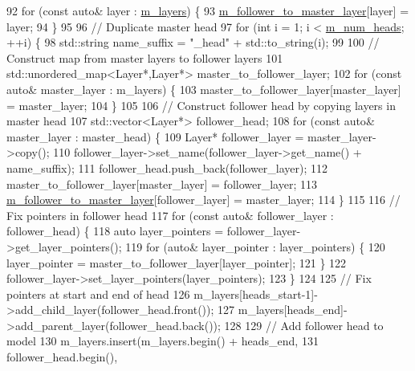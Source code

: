 \begin{DoxyCode}
92   \textcolor{keywordflow}{for} (\textcolor{keyword}{const} \textcolor{keyword}{auto}& layer : \hyperlink{classlbann_1_1model_a0229fc226ec163d1411548446104569d}{m\_layers}) \{
93     \hyperlink{classlbann_1_1siamese__model_aae7af40b4a2db59082cd4c9149a1affd}{m\_follower\_to\_master\_layer}[layer] = layer;
94   \}
95 
96   \textcolor{comment}{// Duplicate master head}
97   \textcolor{keywordflow}{for} (\textcolor{keywordtype}{int} i = 1; i < \hyperlink{classlbann_1_1siamese__model_ad0d7ba3cf40120b4f8e32675c5e9b3db}{m\_num\_heads}; ++i) \{
98     std::string name\_suffix = \textcolor{stringliteral}{"\_head"} + std::to\_string(i);
99 
100     \textcolor{comment}{// Construct map from master layers to follower layers}
101     std::unordered\_map<Layer*,Layer*> master\_to\_follower\_layer;
102     \textcolor{keywordflow}{for} (\textcolor{keyword}{const} \textcolor{keyword}{auto}& master\_layer : m\_layers) \{
103       master\_to\_follower\_layer[master\_layer] = master\_layer;
104     \}
105 
106     \textcolor{comment}{// Construct follower head by copying layers in master head}
107     std::vector<Layer*> follower\_head;
108     \textcolor{keywordflow}{for} (\textcolor{keyword}{const} \textcolor{keyword}{auto}& master\_layer : master\_head) \{
109       Layer* follower\_layer = master\_layer->copy();
110       follower\_layer->set\_name(follower\_layer->get\_name() + name\_suffix);
111       follower\_head.push\_back(follower\_layer);
112       master\_to\_follower\_layer[master\_layer] = follower\_layer;
113       \hyperlink{classlbann_1_1siamese__model_aae7af40b4a2db59082cd4c9149a1affd}{m\_follower\_to\_master\_layer}[follower\_layer] = master\_layer;
114     \}
115 
116     \textcolor{comment}{// Fix pointers in follower head}
117     \textcolor{keywordflow}{for} (\textcolor{keyword}{const} \textcolor{keyword}{auto}& follower\_layer : follower\_head) \{
118       \textcolor{keyword}{auto} layer\_pointers = follower\_layer->get\_layer\_pointers();
119       \textcolor{keywordflow}{for} (\textcolor{keyword}{auto}& layer\_pointer : layer\_pointers) \{
120         layer\_pointer = master\_to\_follower\_layer[layer\_pointer];
121       \}
122       follower\_layer->set\_layer\_pointers(layer\_pointers);
123     \}
124 
125     \textcolor{comment}{// Fix pointers at start and end of head}
126     m\_layers[heads\_start-1]->add\_child\_layer(follower\_head.front());
127     m\_layers[heads\_end]->add\_parent\_layer(follower\_head.back());
128 
129     \textcolor{comment}{// Add follower head to model}
130     m\_layers.insert(m\_layers.begin() + heads\_end,
131                     follower\_head.begin(),

\end{DoxyCode}

